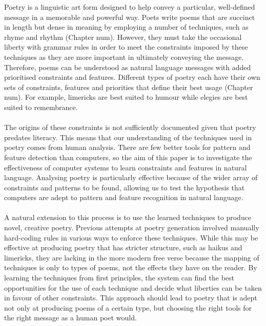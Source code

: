 Poetry is a linguistic art form designed to help convey a particular, well-defined message in a memorable and powerful way. Poets write poems that are succinct in length but dense in meaning by employing a number of techniques, such as rhyme and rhythm (Chapter num). However, they must take the occasional liberty with grammar rules in order to meet the constraints imposed by these techniques as they are more important in ultimately conveying the message. Therefore, poems can be understood as natural language messages with added prioritised constraints and features. Different types of poetry each have their own sets of constraints, features and priorities that define their best usage (Chapter num). For example, limericks are best suited to humour while elegies are best suited to remembrance. 
\\\\
The origins of these constraints is not sufficiently documented given that poetry predates literacy. This means that our understanding of the techniques used in poetry comes from human analysis. There are few better tools for pattern and feature detection than computers, so the aim of this paper is to investigate the effectiveness of computer systems to learn constraints and features in natural language. Analysing poetry is particularly effective because of the wider array of constraints and patterns to be found, allowing us to test the hypothesis that computers are adept to pattern and feature recognition in natural language.
\\\\
A natural extension to this process is to use the learned techniques to produce novel, creative poetry. Previous attempts at poetry generation involved manually hard-coding rules in various ways to enforce these techniques. While this may be effective at producing poetry that has stricter structure, such as haikus and limericks, they are lacking in the more modern free verse because the mapping of techniques is only to types of poems, not the effects they have on the reader. By learning the techniques from first principles, the system can find the best opportunities for the use of each technique and decide what liberties can be taken in favour of other constraints. This approach should lead to poetry that is adept not only at producing poems of a certain type, but choosing the right tools for the right message as a human poet would. 


